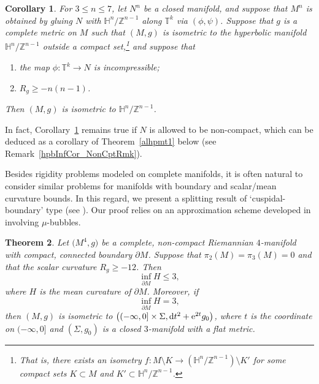 \documentclass[10pt,a4paper]{amsart}
\numberwithin{equation}{section}
\newtheorem{Theorem}{Theorem}[section]
\newtheorem{Cor}[Theorem]{Corollary}
\def\H{\mathbb{H}}
\def\T{\mathbb{T}}
\def\Z{\mathbb{Z}}
\def\ed{{\rm d}}
\begin{document}
\begin{Cor}\label{hpbInfCor}
For $3\leq n\leq 7$, let $N^n$ be a closed manifold, and suppose that
$M^n$ is obtained by gluing $N$ with $\H^n/\Z^{n-1}$ along $\T^{k}$ via $(\phi,\psi)$.
Suppose that $g$ is a complete metric on $M$ such that $(M,g)$ is isometric to the hyperbolic manifold $\H^{n}/\Z^{n-1}$ outside a
 compact set,\footnote{That is, there exists an isometry $f\colon M\setminus K\rightarrow(\H^n/\Z^{n-1})\setminus K'$ for some compact
 sets $K\subset M$ and $K'\subset \H^n/\Z^{n-1}$.} and suppose that
 \begin{enumerate}\itemsep=0pt
\item[$(a)$]  the map $\phi\colon \T^k\rightarrow N$ is incompressible;
\item[$(b)$]  $R_g\geq -n(n-1)$.
\end{enumerate}
Then $(M,g)$ is isometric to $\H^n/\Z^{n-1}$.
\end{Cor}

In fact, Corollary~\ref{hpbInfCor} remains true if $N$ is allowed to be non-compact,
which can be deduced as a corollary of Theorem~\ref{alhpmt1} below (see Remark~\ref{hpbInfCor_NonCptRmk}).

Besides rigidity problems modeled on complete manifolds, it is often natural to consider similar problems for manifolds with boundary and scalar/mean curvature bounds.
In this regard, we present a splitting result of `cuspidal-boundary' type
(see \cite[Section 4, last paragraph]{Gr2019}). Our proof relies on an approximation scheme developed in \cite{Zhu2020} involving
$\mu$-bubbles.

\begin{Theorem}\label{alhpmt2}
Let $\bigl(M^4, g\bigr)$ be a complete, non-compact Riemannian $4$-manifold with
compact, connected boundary $\partial M$.
Suppose that $\pi_2(M) = \pi_3(M) = 0$ and that the scalar curvature $R_g\geq -12$. Then
\[
\inf_{\partial M}H \leq 3,
\]
where $H$ is the mean curvature of $\partial M$.
Moreover, if
\[
\inf_{\partial M}H=3,
\]
then $(M, g)$ is isometric to $\big((-\infty, 0]\times \Sigma, \ed t^2+{\rm e}^{2t}g_0\big)$, where $t$ is the coordinate on $(-\infty, 0]$ and $(\Sigma, g_0)$ is a closed
$3$-manifold with a flat metric.
\end{Theorem}
\end{document}
